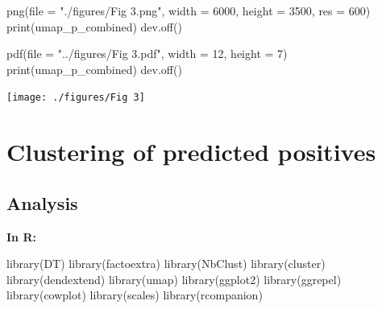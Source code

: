 \documentclass[
  11pt,
  oneside]{book}
\newenvironment{Shaded}{\begin{snugshade}}{\end{snugshade}}
\newcommand{\AttributeTok}[1]{\textcolor[rgb]{0.77,0.63,0.00}{#1}}
\newcommand{\DecValTok}[1]{\textcolor[rgb]{0.00,0.00,0.81}{#1}}
\newcommand{\FunctionTok}[1]{\textcolor[rgb]{0.00,0.00,0.00}{#1}}
\newcommand{\NormalTok}[1]{#1}
\newcommand{\StringTok}[1]{\textcolor[rgb]{0.31,0.60,0.02}{#1}}
\begin{document}
\begin{Shaded}
\begin{Highlighting}[]
\FunctionTok{png}\NormalTok{(}\AttributeTok{file =} \StringTok{"./figures/Fig 3.png"}\NormalTok{, }\AttributeTok{width =} \DecValTok{6000}\NormalTok{, }\AttributeTok{height =} \DecValTok{3500}\NormalTok{, }\AttributeTok{res =} \DecValTok{600}\NormalTok{)}
\FunctionTok{print}\NormalTok{(umap\_p\_combined)}
\FunctionTok{dev.off}\NormalTok{()}

\FunctionTok{pdf}\NormalTok{(}\AttributeTok{file =} \StringTok{"../figures/Fig 3.pdf"}\NormalTok{, }\AttributeTok{width =} \DecValTok{12}\NormalTok{, }\AttributeTok{height =} \DecValTok{7}\NormalTok{)}
\FunctionTok{print}\NormalTok{(umap\_p\_combined)}
\FunctionTok{dev.off}\NormalTok{()}
\end{Highlighting}
\end{Shaded}

\begin{center}\texttt{[image: ./figures/Fig 3]} \end{center}

\hypertarget{clustering-of-predicted-positives}{%
\section{Clustering of predicted positives}\label{clustering-of-predicted-positives}}

\hypertarget{analysis-5}{%
\subsection{Analysis}\label{analysis-5}}

\textbf{In R: }

\begin{Shaded}
\begin{Highlighting}[]
\FunctionTok{library}\NormalTok{(DT)}
\FunctionTok{library}\NormalTok{(factoextra)}
\FunctionTok{library}\NormalTok{(NbClust)}
\FunctionTok{library}\NormalTok{(cluster)}
\FunctionTok{library}\NormalTok{(dendextend)}
\FunctionTok{library}\NormalTok{(umap)}
\FunctionTok{library}\NormalTok{(ggplot2)}
\FunctionTok{library}\NormalTok{(ggrepel)}
\FunctionTok{library}\NormalTok{(cowplot)}
\FunctionTok{library}\NormalTok{(scales)}
\FunctionTok{library}\NormalTok{(rcompanion)}
\end{Highlighting}
\end{Shaded}
\end{document}
